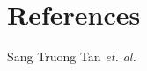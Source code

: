 \documentclass[D:/Latex/Internship/Report/Latex/Report.tex]{subfiles}
\begin{document}
  \chapter{References}
  Sang Truong Tan \textit{et. al. } \cite{OVCam, Stm32F446datasheet, Stm32f4usermanual}
  
  
\end{document}
